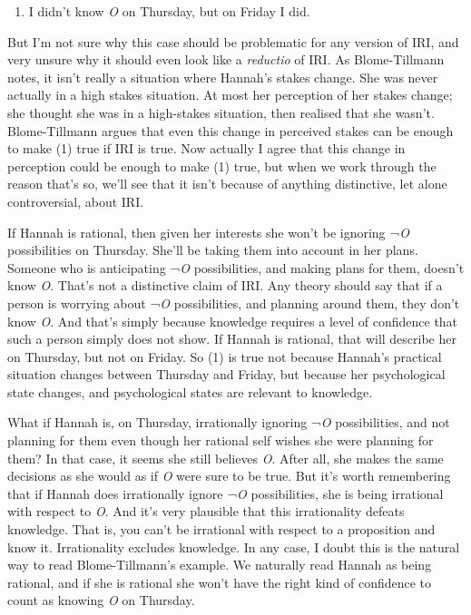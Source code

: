 \documentclass[
  11pt,
  letterpaper,
  DIV=11,
  numbers=noendperiod,
  twoside]{scrartcl}
\providecommand{\tightlist}{%
  \setlength{\itemsep}{0pt}\setlength{\parskip}{0pt}}
\begin{document}
\begin{enumerate}
\def\labelenumi{(\arabic{enumi})}
\tightlist
\item
  I didn't know \emph{O} on Thursday, but on Friday I did.
\end{enumerate}

But I'm not sure why this case should be problematic for any version of
IRI, and very unsure why it should even look like a \emph{reductio} of
IRI. As Blome-Tillmann notes, it isn't really a situation where Hannah's
stakes change. She was never actually in a high stakes situation. At
most her perception of her stakes change; she thought she was in a
high-stakes situation, then realised that she wasn't. Blome-Tillmann
argues that even this change in perceived stakes can be enough to make
(1) true if IRI is true. Now actually I agree that this change in
perception could be enough to make (1) true, but when we work through
the reason that's so, we'll see that it isn't because of anything
distinctive, let alone controversial, about IRI.

If Hannah is rational, then given her interests she won't be ignoring
¬\emph{O} possibilities on Thursday. She'll be taking them into account
in her plans. Someone who is anticipating ¬\emph{O} possibilities, and
making plans for them, doesn't know \emph{O}. That's not a distinctive
claim of IRI. Any theory should say that if a person is worrying about
¬\emph{O} possibilities, and planning around them, they don't know
\emph{O}. And that's simply because knowledge requires a level of
confidence that such a person simply does not show. If Hannah is
rational, that will describe her on Thursday, but not on Friday. So (1)
is true not because Hannah's practical situation changes between
Thursday and Friday, but because her psychological state changes, and
psychological states are relevant to knowledge.

What if Hannah is, on Thursday, irrationally ignoring ¬\emph{O}
possibilities, and not planning for them even though her rational self
wishes she were planning for them? In that case, it seems she still
believes \emph{O}. After all, she makes the same decisions as she would
as if \emph{O} were sure to be true. But it's worth remembering that if
Hannah does irrationally ignore ¬\emph{O} possibilities, she is being
irrational with respect to \emph{O}. And it's very plausible that this
irrationality defeats knowledge. That is, you can't be irrational with
respect to a proposition and know it. Irrationality excludes knowledge.
In any case, I doubt this is the natural way to read Blome-Tillmann's
example. We naturally read Hannah as being rational, and if she is
rational she won't have the right kind of confidence to count as knowing
\emph{O} on Thursday.
\end{document}
